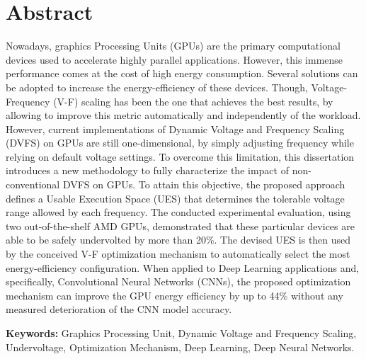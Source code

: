 
\section*{Abstract}


Nowadays, graphics Processing Units (GPUs) are the primary computational devices used to accelerate highly parallel applications. However, this immense performance comes at the cost of high energy consumption. Several solutions can be adopted to increase the energy-efficiency of these devices. Though, Voltage-Frequency (V-F) scaling has been the one that achieves the best results, by allowing to improve this metric automatically and independently of the workload. 
However, current implementations of Dynamic Voltage and Frequency Scaling (DVFS) on GPUs are still one-dimensional, by simply adjusting frequency while relying on default voltage settings. To overcome this limitation, this dissertation introduces a new methodology to fully characterize the impact of non-conventional DVFS on GPUs. To attain this objective, the proposed approach defines a Usable Execution Space (UES) that determines the tolerable voltage range allowed by each frequency. The conducted experimental evaluation, using two out-of-the-shelf AMD GPUs, demonstrated that these particular devices are able to be safely undervolted by more than 20\%. The devised UES is then used by the conceived V-F optimization mechanism to automatically select the most energy-efficiency configuration. When applied to Deep Learning applications and, specifically, Convolutional Neural Networks (CNNs), the proposed optimization mechanism can improve the GPU energy efficiency by up to 44\% without any measured deterioration of the CNN model accuracy.

\vfill

\textbf{\Large Keywords:} Graphics Processing Unit, Dynamic Voltage and Frequency Scaling, Undervoltage, Optimization Mechanism, Deep Learning, Deep Neural Networks.

